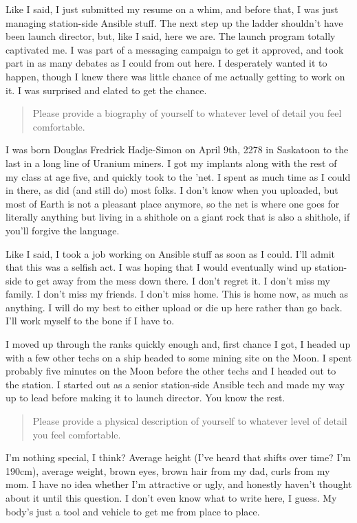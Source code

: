 \noindent Like I said, I just submitted my resume on a whim, and before that, I was just managing station-side Ansible stuff. The next step up the ladder shouldn't have been launch director, but, like I said, here we are. The launch program totally captivated me. I was part of a messaging campaign to get it approved, and took part in as many debates as I could from out here. I desperately wanted it to happen, though I knew there was little chance of me actually getting to work on it. I was surprised and elated to get the chance.

\begin{quote}
Please provide a biography of yourself to whatever level of detail you feel comfortable.
\end{quote}

\noindent I was born Douglas Fredrick Hadje-Simon on April 9th, 2278 in Saskatoon to the last in a long line of Uranium miners. I got my implants along with the rest of my class at age five, and quickly took to the 'net. I spent as much time as I could in there, as did (and still do) most folks. I don't know when you uploaded, but most of Earth is not a pleasant place anymore, so the net is where one goes for literally anything but living in a shithole on a giant rock that is also a shithole, if you'll forgive the language.

Like I said, I took a job working on Ansible stuff as soon as I could. I'll admit that this was a selfish act. I was hoping that I would eventually wind up station-side to get away from the mess down there. I don't regret it. I don't miss my family. I don't miss my friends. I don't miss home. This is home now, as much as anything. I will do my best to either upload or die up here rather than go back. I'll work myself to the bone if I have to.

I moved up through the ranks quickly enough and, first chance I got, I headed up with a few other techs on a ship headed to some mining site on the Moon. I spent probably five minutes on the Moon before the other techs and I headed out to the station. I started out as a senior station-side Ansible tech and made my way up to lead before making it to launch director. You know the rest.

\begin{quote}
Please provide a physical description of yourself to whatever level of detail you feel comfortable.
\end{quote}

\noindent I'm nothing special, I think? Average height (I've heard that shifts over time? I'm 190cm), average weight, brown eyes, brown hair from my dad, curls from my mom. I have no idea whether I'm attractive or ugly, and honestly haven't thought about it until this question. I don't even know what to write here, I guess. My body's just a tool and vehicle to get me from place to place.

